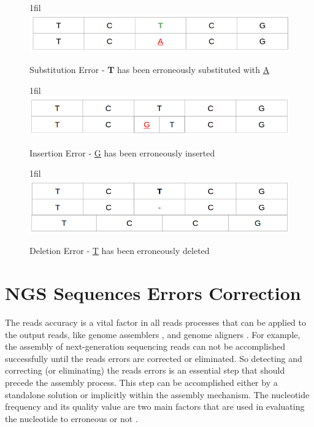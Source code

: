 \documentclass[12pt,openany]{llncs}
\makeatletter
\newcommand*{\centerfloat}{%
  \parindent \z@
  \leftskip \z@ \@plus 1fil \@minus \textwidth
  \rightskip\leftskip
  \parfillskip \z@skip}
\makeatother
\begin{document}
\begin{figure}
	\centerfloat
	\includegraphics[width=1\linewidth]{./figs/ErrCrr-1}
	\caption{\label{fig:fig-ErrCrr-1}{Substitution Error} - \textbf{T} has been erroneously substituted with \underline{A}}
\end{figure}
\vspace{2cm}
\begin{figure}
	\centerfloat
	\includegraphics[width=1\linewidth]{./figs/ErrCrr-2}
	\caption{\label{fig:fig-ErrCrr-2}{Insertion Error} - \underline{G} has been erroneously inserted}
\end{figure}
\vspace{2cm}
\begin{figure}
	\centerfloat
	\includegraphics[width=1\linewidth]{./figs/ErrCrr-3}
	\caption{\label{fig:fig-ErrCrr-3}{Deletion Error} - \underline{T} has been erroneously deleted}
\end{figure}


\newpage
\section{NGS Sequences Errors Correction}
The reads accuracy is a vital factor in all reads processes that can be applied to the output reads, like genome assemblers \cite{assembly,assembly1}, and genome aligners \cite{alignment}. For example, the assembly of next-generation sequencing reads can not be accomplished successfully until the reads errors are corrected or eliminated. So detecting and correcting (or eliminating) the reads errors is an essential step that should precede the assembly process. This step can be accomplished either by a standalone solution or implicitly within the assembly mechanism. The nucleotide frequency and its quality value are two main factors that are used in evaluating the nucleotide to erroneous or not \cite{ErrCorr,ErrCorr1}. 
\end{document}
